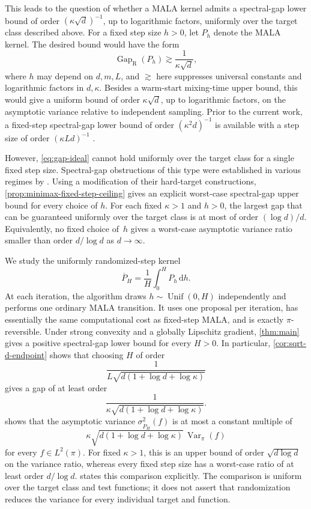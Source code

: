 \documentclass[11pt]{article}
\newcommand{\Var}{\operatorname{Var}}
\newcommand{\Gap}{\operatorname{Gap}_{\mathrm{R}}}
\newcommand{\1}{\mathbf 1}
\newcommand{\df}{\mathrm{d}}
\begin{document}
	This leads to the question of whether a MALA kernel admits a
	spectral-gap lower bound of order $(\kappa\sqrt d)^{-1}$, up to
	logarithmic factors, uniformly over the target class described above.
	For a fixed step size $h>0$, let $P_h$
	denote the MALA kernel. The desired bound would have the form
	\begin{equation}\label{eq:gap-ideal}
		\Gap(P_h)\gtrsim\frac{1}{\kappa\sqrt d},
	\end{equation}
	where $h$ may depend on $d,m,L$, and $\gtrsim$ here suppresses universal
	constants and logarithmic factors in $d, \kappa$. Besides a warm-start mixing-time upper bound,
	this would give a uniform bound of order $\kappa\sqrt d$, up to
	logarithmic factors, on the asymptotic variance relative to independent
	sampling. 
	Prior to the current work, a fixed-step spectral-gap lower bound of order $(\kappa^2d)^{-1}$ is
	available with a step size of order $(\kappa Ld)^{-1}$
	\citep{LiuTong2026}.
	
	However, \eqref{eq:gap-ideal} cannot hold uniformly over the target
	class for a single fixed step size. Spectral-gap obstructions of this
	type were established in various regimes by
	\citet{ChewiEtAl2021,LeeShenTian2021,WuSchmidlerChen2022}.
	Using a modification of their hard-target constructions,
	\cref{prop:minimax-fixed-step-ceiling} gives an explicit worst-case
	spectral-gap upper bound for every choice of $h$.
	For each fixed $\kappa>1$ and $h > 0$, the largest gap that can be guaranteed uniformly over the target class is at most of order
	$(\log d)/d$. Equivalently, no fixed choice of~$h$ gives a worst-case asymptotic
	variance ratio smaller than order $d/\log d$ as $d\to\infty$.
	
	
	We study the uniformly randomized-step kernel
	\[
	\overline P_H=\frac1H\int_0^H P_h\,\df h.
	\]
	At each iteration, the algorithm draws $h\sim\operatorname{Unif}(0,H)$
	independently and performs one ordinary MALA transition. It uses one
	proposal per iteration, has essentially the same computational cost as
	fixed-step MALA, and is exactly $\pi$-reversible. Under strong
	convexity and a globally Lipschitz gradient, \cref{thm:main} gives a
	positive spectral-gap lower bound for every $H>0$. In particular,
	\cref{cor:sqrt-d-endpoint} shows that choosing $H$ of order
	\[
	\frac{1}{L\sqrt{d(1+ \log d +\log\kappa)}}
	\]
	gives a gap of at least order
	\[
	\frac{1}{\kappa\sqrt{d(1+ \log d +\log\kappa)} }.
	\]
	 shows that the asymptotic variance $\sigma_{\overline P_H}^2(f)$ is at
	most a constant multiple of
	$$\kappa\sqrt{d(1+\log d+\log\kappa)}\,\Var_\pi(f)$$ for every
	$f\in L^2(\pi)$. For fixed $\kappa>1$, this is an upper bound of order
	$\sqrt{d\log d}$ on the variance ratio, whereas every fixed step size
	has a worst-case ratio of at least order $d/\log d$.
	 states this comparison explicitly.
	The comparison is uniform over the target class and test functions;
	it does not assert that randomization reduces the variance for every
	individual target and function.
	
\end{document}
